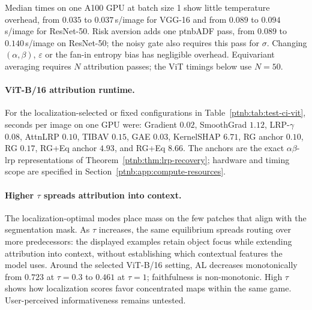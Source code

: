 Median times on one A100 GPU at batch size 1 show little temperature overhead, from $0.035$ to $0.037$\,s/image for VGG-16 and from $0.089$ to $0.094$\,s/image for ResNet-50. Risk aversion adds one \ac{ptnbADF} pass, from $0.089$ to $0.140$\,s/image on ResNet-50; the noisy gate also requires this pass for $\sigma$. Changing $(\alpha,\beta)$, $\varepsilon$ or the fan-in entropy bias has negligible overhead. Equivariant averaging requires $N$ attribution passes; the ViT timings below use $N=50$.

\paragraph{ViT-B/16 attribution runtime.} For the localization-selected or fixed configurations in Table~\ref{ptnb:tab:test-ci-vit}, seconds per image on one GPU were: Gradient $0.02$, SmoothGrad $1.12$, LRP-$\gamma$ $0.08$, AttnLRP $0.10$, TIBAV $0.15$, GAE $0.03$, KernelSHAP $6.71$, RG anchor $0.10$, RG $0.17$, RG+Eq anchor $4.93$, and RG+Eq $8.66$. The anchors are the exact $\alpha\beta$-\ac{lrp} representations of Theorem~\ref{ptnb:thm:lrp-recovery}; hardware and timing scope are specified in Section~\ref{ptnb:app:compute-resources}.

\paragraph{Higher $\tau$ spreads attribution into context.}
The localization-optimal modes place mass on the few patches that align with the segmentation mask. As $\tau$ increases, the same equilibrium spreads routing over more predecessors: the displayed examples retain object focus while extending attribution into context, without establishing which contextual features the model uses. Around the selected ViT-B/16 setting, AL decreases monotonically from $0.723$ at $\tau{=}0.3$ to $0.461$ at $\tau{=}1$; faithfulness is non-monotonic. High $\tau$ shows how localization scores favor concentrated maps within the same game. User-perceived informativeness remains untested.

\begin{table}[htbp]
    \centering
    \caption[ViT-B/16 Routing Game attention rule ablation]{\ac{vit}-B/16, \ac{rg}: attention ablation on 565 ImageNet-S test images at the anchor and validation-selected settings. Cells: gradient fallback above; composite Value rule (Theorem~\ref{ptnb:thm:attn-ab-recovery}, gray) below. Configurations: Section~\ref{ptnb:app:config-symbols}. $^{\dagger}$: paired bootstrap (McNemar for PG), Holm-corrected over the table, $p<0.05$.}
    \label{ptnb:tab:abl-gradient-fallback}
%
\end{table}

